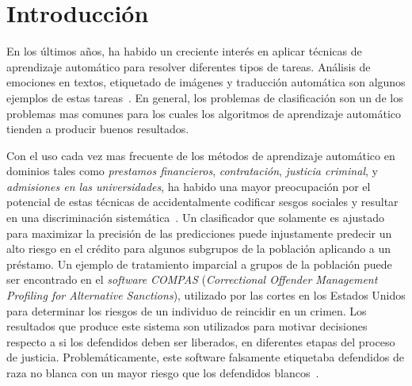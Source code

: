 \chapter*{Introducción}\label{chapter:introduction}



En los últimos años, ha habido un creciente interés en aplicar técnicas de aprendizaje automático para resolver diferentes tipos de tareas.
Análisis de emociones en textos, etiquetado de imágenes y traducción automática son algunos ejemplos de estas tareas~.
En general, los problemas de clasificación son un de los problemas mas comunes para los cuales los algoritmos de aprendizaje automático tienden a producir buenos resultados.


Con el uso cada vez mas frecuente de los métodos de aprendizaje automático en dominios tales como \emph{prestamos financieros}, \emph{contratación}, \emph{justicia criminal}, y \emph{admisiones en las universidades}, ha habido una mayor preocupación por el potencial de estas técnicas de accidentalmente codificar sesgos sociales y resultar en una discriminación sistemática~.
Un clasificador que solamente es ajustado para maximizar la precisión de las predicciones puede injustamente predecir un alto riesgo en el crédito para algunos subgrupos de la población aplicando a un préstamo.
Un ejemplo de tratamiento imparcial a grupos de la población puede ser encontrado en el \emph{software} \emph{COMPAS} (\emph{Correctional Offender Management Profiling for Alternative Sanctions}), utilizado por las cortes en los Estados Unidos para determinar los riesgos de un individuo de reincidir en un crimen.
Los resultados que produce este sistema son utilizados para motivar decisiones respecto a si los defendidos deben ser liberados, en diferentes etapas del proceso de justicia.
Problemáticamente, este software falsamente etiquetaba defendidos de raza no blanca con un mayor riesgo que los defendidos blancos~.


